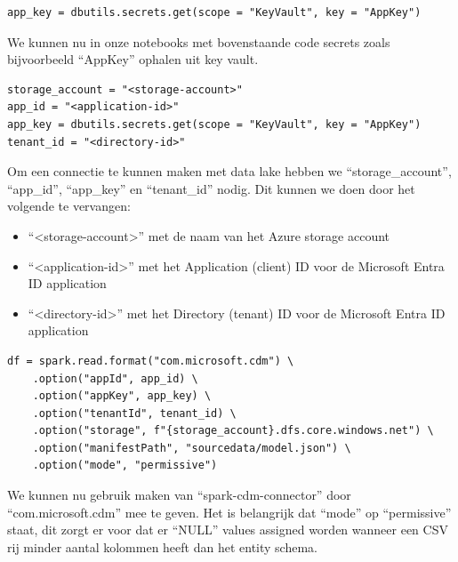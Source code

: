 \begin{verbatim}
app_key = dbutils.secrets.get(scope = "KeyVault", key = "AppKey")
\end{verbatim}

We kunnen nu in onze notebooks met bovenstaande code secrets zoals bijvoorbeeld ``AppKey'' ophalen uit key vault.


\begin{verbatim}
storage_account = "<storage-account>"
app_id = "<application-id>"
app_key = dbutils.secrets.get(scope = "KeyVault", key = "AppKey")
tenant_id = "<directory-id>"
\end{verbatim}

Om een connectie te kunnen maken met data lake hebben we ``storage\_account'', ``app\_id'', ``app\_key'' en ``tenant\_id'' nodig. Dit kunnen we doen door het volgende te vervangen:

\begin{itemize}
    \item ``<storage-account>'' met de naam van het Azure storage account
    \item ``<application-id>'' met het Application (client) ID voor de Microsoft Entra ID application
    \item ``<directory-id>'' met het Directory (tenant) ID voor de Microsoft Entra ID application
\end{itemize}



\begin{verbatim}
df = spark.read.format("com.microsoft.cdm") \
    .option("appId", app_id) \
    .option("appKey", app_key) \
    .option("tenantId", tenant_id) \
    .option("storage", f"{storage_account}.dfs.core.windows.net") \
    .option("manifestPath", "sourcedata/model.json") \
    .option("mode", "permissive")
\end{verbatim}

We kunnen nu gebruik maken van ``spark-cdm-connector'' door ``com.microsoft.cdm'' mee te geven. Het is belangrijk dat ``mode'' op ``permissive'' staat, dit zorgt er voor dat er ``NULL'' values assigned worden wanneer een CSV rij minder aantal kolommen heeft dan het entity schema.

